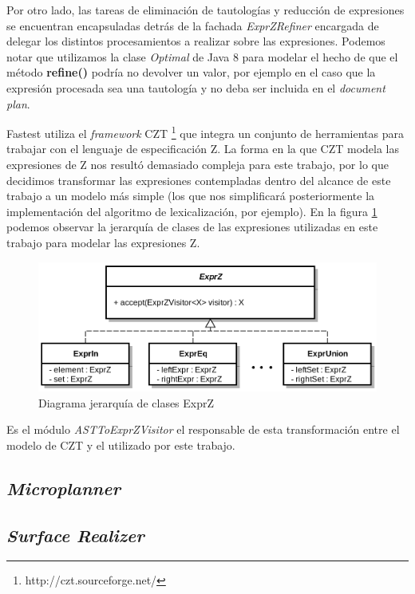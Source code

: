 Por otro lado, las tareas de eliminación de tautologías y reducción de expresiones se encuentran encapsuladas detrás de la fachada \emph{ExprZRefiner} encargada de delegar los distintos procesamientos a realizar sobre las expresiones. Podemos notar que utilizamos la clase \emph{Optimal} de Java 8 para modelar el hecho de que el método \textbf{refine()} podría no devolver un valor, por ejemplo en el caso que la expresión procesada sea una tautología y no deba ser incluida en el \textit{document plan}.

Fastest utiliza el \textit{framework} CZT \footnote{http://czt.sourceforge.net/} que integra un conjunto de herramientas para trabajar con el lenguaje de especificación Z. La forma en la que CZT modela las expresiones de Z nos resultó demasiado compleja para este trabajo, por lo que decidimos transformar las expresiones contempladas dentro del alcance de este trabajo a un modelo más simple (los que nos simplificará posteriormente la implementación del algoritmo de lexicalización, por ejemplo). En la figura \ref{fig:exprz_classes} podemos observar la jerarquía de clases de las expresiones utilizadas en este trabajo para modelar las expresiones Z. 

\begin{figure}[H]
  	\centering
	\includegraphics[scale=0.3]{img/exprz_classes.png}
	\caption{Diagrama jerarquía de clases ExprZ}
  	\label{fig:exprz_classes}
\end{figure}

Es el módulo \emph{ASTToExprZVisitor} el responsable de esta transformación entre el modelo de CZT y el utilizado por este trabajo.

\subsection{\textit{Microplanner}}

\subsection{\textit{Surface Realizer}}